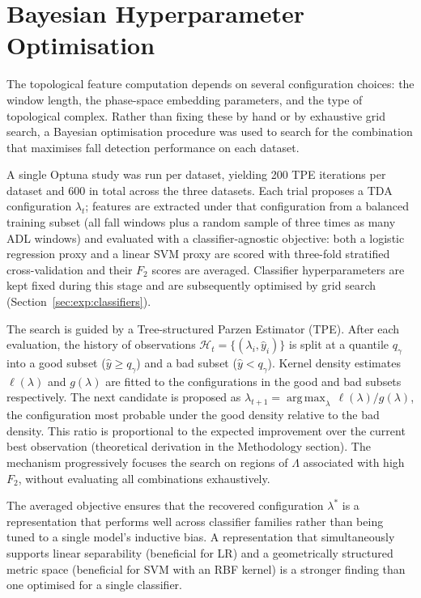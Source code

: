 \documentclass[onluarkali,ingilizce,yukseklisans,karton,LisansustuEgitim]{itutez}
\DeclareMathOperator*{\argmax}{arg\,max}
\providecommand{\1}{\mathbf{1}}
\begin{document}
\section{Bayesian Hyperparameter Optimisation}
\label{subsec:hparam}

The topological feature computation depends on several configuration choices: the window length, the phase-space embedding parameters, and the type of topological complex. Rather than fixing these by hand or by exhaustive grid search, a Bayesian optimisation procedure was used to search for the combination that maximises fall detection performance on each dataset.

A single Optuna study was run per dataset, yielding 200 TPE iterations per dataset and 600 in total across the three datasets. Each trial proposes a TDA configuration $\lambda_t$; features are extracted under that configuration from a balanced training subset (all fall windows plus a random sample of three times as many ADL windows) and evaluated with a classifier-agnostic objective: both a logistic regression proxy and a linear SVM proxy are scored with three-fold stratified cross-validation and their $F_2$ scores are averaged. Classifier hyperparameters are kept fixed during this stage and are subsequently optimised by grid search (Section~\ref{sec:exp:classifiers}).

The search is guided by a Tree-structured Parzen Estimator (TPE). After each evaluation, the history of observations $\mathcal{H}_t=\{(\lambda_i,\hat{y}_i)\}$ is split at a quantile $q_\gamma$ into a good subset ($\hat{y}\geq q_\gamma$) and a bad subset ($\hat{y}<q_\gamma$). Kernel density estimates $\ell(\lambda)$ and $g(\lambda)$ are fitted to the configurations in the good and bad subsets respectively. The next candidate is proposed as $\lambda_{t+1}=\argmax_\lambda\,\ell(\lambda)/g(\lambda)$, the configuration most probable under the good density relative to the bad density. This ratio is proportional to the expected improvement over the current best observation (theoretical derivation in the Methodology section). The mechanism progressively focuses the search on regions of $\Lambda$ associated with high $F_2$, without evaluating all combinations exhaustively.

The averaged objective ensures that the recovered configuration $\lambda^*$ is a representation that performs well across classifier families rather than being tuned to a single model's inductive bias. A representation that simultaneously supports linear separability (beneficial for LR) and a geometrically structured metric space (beneficial for SVM with an RBF kernel) is a stronger finding than one optimised for a single classifier.
\end{document}
